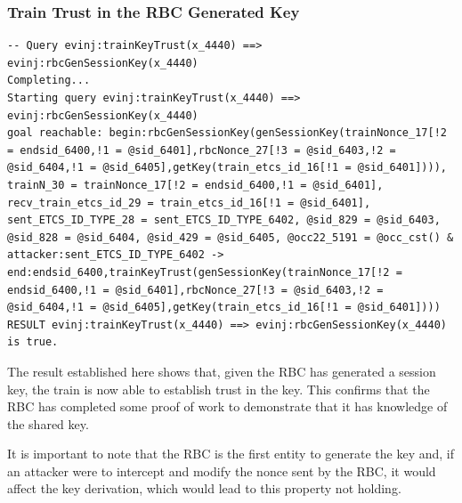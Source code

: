 \documentclass[twoside,11pt,a4paper]{article}
\begin{document}
\subsubsection{Train Trust in the RBC Generated Key}
\begin{lstlisting}
-- Query evinj:trainKeyTrust(x_4440) ==> evinj:rbcGenSessionKey(x_4440)
Completing...
Starting query evinj:trainKeyTrust(x_4440) ==> evinj:rbcGenSessionKey(x_4440)
goal reachable: begin:rbcGenSessionKey(genSessionKey(trainNonce_17[!2 = endsid_6400,!1 = @sid_6401],rbcNonce_27[!3 = @sid_6403,!2 = @sid_6404,!1 = @sid_6405],getKey(train_etcs_id_16[!1 = @sid_6401]))), trainN_30 = trainNonce_17[!2 = endsid_6400,!1 = @sid_6401], recv_train_etcs_id_29 = train_etcs_id_16[!1 = @sid_6401], sent_ETCS_ID_TYPE_28 = sent_ETCS_ID_TYPE_6402, @sid_829 = @sid_6403, @sid_828 = @sid_6404, @sid_429 = @sid_6405, @occ22_5191 = @occ_cst() & attacker:sent_ETCS_ID_TYPE_6402 -> end:endsid_6400,trainKeyTrust(genSessionKey(trainNonce_17[!2 = endsid_6400,!1 = @sid_6401],rbcNonce_27[!3 = @sid_6403,!2 = @sid_6404,!1 = @sid_6405],getKey(train_etcs_id_16[!1 = @sid_6401])))
RESULT evinj:trainKeyTrust(x_4440) ==> evinj:rbcGenSessionKey(x_4440) is true.
\end{lstlisting}
The result established here shows that, given the RBC has generated a session key, the train is now able to establish trust in the key. This confirms that the RBC has completed some proof of work to demonstrate that it has knowledge of the shared key.

It is important to note that the RBC is the first entity to generate the key and, if an attacker were to intercept and modify the nonce sent by the RBC, it would affect the key derivation, which would lead to this property not holding.\\
\end{document}
